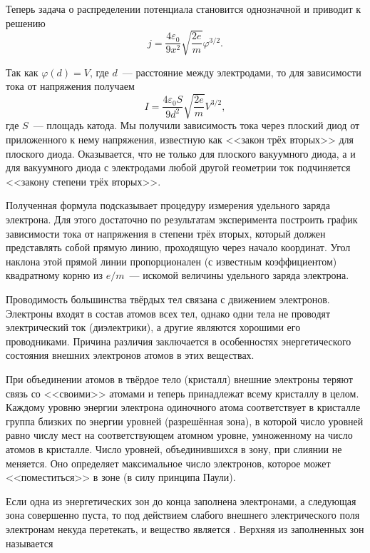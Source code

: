 Теперь задача о распределении потенциала становится однозначной и приводит к решению
\begin{equation*}
	j=\frac{4\varepsilon_0}{9x^2}\sqrt{\frac{2e}{m}}\varphi^{3/2}.
\end{equation*}

Так как $\varphi(d)=V$, где $d$~--- расстояние между электродами, то для зависимости тока от напряжения получаем
\begin{equation*}
	I=\frac{4\varepsilon_0 S}{9d^2}\sqrt{\frac{2e}{m}}V^{3/2},
\end{equation*}
где $S$~--- площадь катода. Мы получили зависимость тока через плоский диод от приложенного к нему напряжения, известную как <<закон трёх вторых>> для плоского диода. Оказывается, что не только для плоского вакуумного диода, а и для вакуумного диода с электродами любой другой геометрии ток подчиняется <<закону степени трёх вторых>>.

Полученная формула подсказывает процедуру измерения удельного заряда электрона. Для этого достаточно по
результатам эксперимента построить график зависимости тока от напряжения в степени трёх вторых, который должен
представлять собой прямую линию, проходящую через начало координат. Угол наклона этой прямой линии пропорционален (с известным коэффициентом) квадратному корню из $e/m$~--- искомой величины удельного заряда электрона.


Проводимость большинства твёрдых тел связана с движением электронов. Электроны входят в состав атомов всех тел, однако одни тела не проводят электрический ток (диэлектрики), а другие являются хорошими его проводниками. Причина различия заключается в особенностях энергетического состояния внешних электронов атомов в этих веществах.

При объединении атомов в твёрдое тело (кристалл) внешние электроны теряют связь со <<своими>> атомами и теперь принадлежат всему кристаллу в целом. Каждому уровню энергии электрона одиночного атома соответствует в кристалле группа близких по энергии уровней (разрешённая зона), в которой число уровней равно числу мест на соответствующем атомном уровне, умноженному на число атомов в кристалле. Число уровней, объединившихся в зону, при слиянии не меняется. Оно определяет максимальное число электронов, которое может <<поместиться>> в зоне (в силу принципа Паули).

Если одна из энергетических зон до конца заполнена электронами, а следующая зона совершенно пуста, то под действием слабого внешнего электрического поля электронам некуда перетекать, и вещество является . Верхняя из заполненных зон называется 

